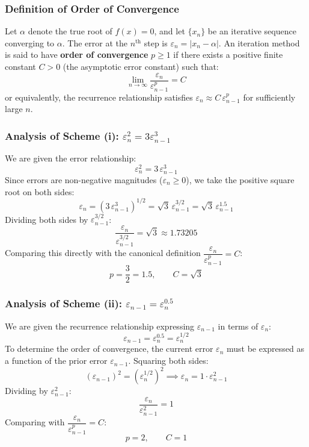 \documentclass[11pt,a4paper]{article}
\newcommand{\abs}[1]{\left\lvert#1\right\rvert}
\begin{document}
\subsubsection*{Definition of Order of Convergence}
Let $\alpha$ denote the true root of $f(x) = 0$, and let $\{x_n\}$ be an iterative sequence converging to $\alpha$. The error at the $n^{\text{th}}$ step is $\varepsilon_n = \abs{x_n - \alpha}$. An iteration method is said to have \textbf{order of convergence} $p \ge 1$ if there exists a positive finite constant $C > 0$ (the asymptotic error constant) such that:
\begin{equation}
    \lim_{n \to \infty} \frac{\varepsilon_n}{\varepsilon_{n-1}^p} = C
\end{equation}
or equivalently, the recurrence relationship satisfies $\varepsilon_n \approx C \, \varepsilon_{n-1}^p$ for sufficiently large $n$.

\subsubsection*{Analysis of Scheme (i): $\varepsilon_n^2 = 3\varepsilon_{n-1}^3$}
We are given the error relationship:
\begin{equation}
\varepsilon_n^2 = 3\,\varepsilon_{n-1}^3
\end{equation}
Since errors are non-negative magnitudes ($\varepsilon_n \ge 0$), we take the positive square root on both sides:
\begin{equation}
\varepsilon_n = \left(3\,\varepsilon_{n-1}^3\right)^{1/2} = \sqrt{3} \, \varepsilon_{n-1}^{3/2} = \sqrt{3} \, \varepsilon_{n-1}^{1.5}
\end{equation}
Dividing both sides by $\varepsilon_{n-1}^{3/2}$:
\begin{equation}
\frac{\varepsilon_n}{\varepsilon_{n-1}^{3/2}} = \sqrt{3} \approx 1.73205
\end{equation}
Comparing this directly with the canonical definition $\dfrac{\varepsilon_n}{\varepsilon_{n-1}^p} = C$:
\[
p = \frac{3}{2} = 1.5, \qquad C = \sqrt{3}
\]

\subsubsection*{Analysis of Scheme (ii): $\varepsilon_{n-1} = \varepsilon_n^{0.5}$}
We are given the recurrence relationship expressing $\varepsilon_{n-1}$ in terms of $\varepsilon_n$:
\begin{equation}
\varepsilon_{n-1} = \varepsilon_n^{0.5} = \varepsilon_n^{1/2}
\end{equation}
To determine the order of convergence, the current error $\varepsilon_n$ must be expressed as a function of the prior error $\varepsilon_{n-1}$. Squaring both sides:
\begin{equation}
\left(\varepsilon_{n-1}\right)^2 = \left(\varepsilon_n^{1/2}\right)^2 \implies \varepsilon_n = 1 \cdot \varepsilon_{n-1}^2
\end{equation}
Dividing by $\varepsilon_{n-1}^2$:
\begin{equation}
\frac{\varepsilon_n}{\varepsilon_{n-1}^2} = 1
\end{equation}
Comparing with $\dfrac{\varepsilon_n}{\varepsilon_{n-1}^p} = C$:
\[
p = 2, \qquad C = 1
\]
\end{document}
